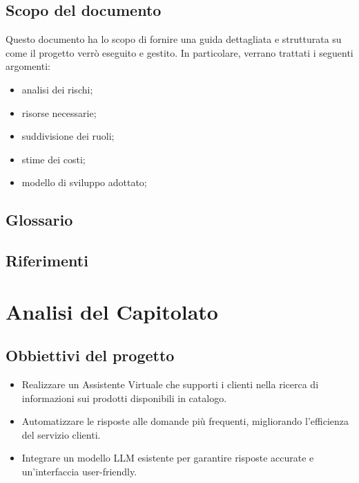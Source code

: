 \documentclass{article}
\begin{document}
    \subsection{Scopo del documento}
    Questo documento ha lo scopo di fornire una guida dettagliata e strutturata su come 
    il progetto verrò eseguito e gestito. In particolare, verrano trattati i seguenti 
    argomenti:
    \begin{itemize}
        \item analisi dei rischi;
        \item risorse necessarie;
        \item suddivisione dei ruoli;
        \item stime dei costi;
        \item modello di sviluppo adottato;
    \end{itemize}

    \subsection{Glossario}

    \subsection{Riferimenti}




\section{Analisi del Capitolato}
    \subsection{Obbiettivi del progetto}
    \begin{itemize}
        \item Realizzare un Assistente Virtuale che supporti i clienti nella ricerca 
        di informazioni sui prodotti disponibili in catalogo.
        \item Automatizzare le risposte alle domande più frequenti, migliorando 
        l'efficienza del servizio clienti.
        \item Integrare un modello LLM esistente per garantire risposte accurate e 
        un'interfaccia user-friendly.
    \end{itemize}
\end{document}

